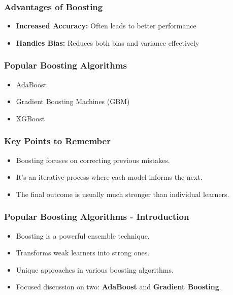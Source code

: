 \documentclass[aspectratio=169]{beamer}
\begin{document}
\begin{frame}[fragile]
    \frametitle{Advantages of Boosting}
    \begin{itemize}
        \item \textbf{Increased Accuracy:} Often leads to better performance
        \item \textbf{Handles Bias:} Reduces both bias and variance effectively
    \end{itemize}
\end{frame}

\begin{frame}[fragile]
    \frametitle{Popular Boosting Algorithms}
    \begin{itemize}
        \item AdaBoost
        \item Gradient Boosting Machines (GBM)
        \item XGBoost
    \end{itemize}
\end{frame}

\begin{frame}[fragile]
    \frametitle{Key Points to Remember}
    \begin{itemize}
        \item Boosting focuses on correcting previous mistakes.
        \item It’s an iterative process where each model informs the next.
        \item The final outcome is usually much stronger than individual learners.
    \end{itemize}
\end{frame}

\begin{frame}[fragile]
    \frametitle{Popular Boosting Algorithms - Introduction}
    \begin{itemize}
        \item Boosting is a powerful ensemble technique.
        \item Transforms weak learners into strong ones.
        \item Unique approaches in various boosting algorithms.
        \item Focused discussion on two: \textbf{AdaBoost} and \textbf{Gradient Boosting}.
    \end{itemize}
\end{frame}
\end{document}
